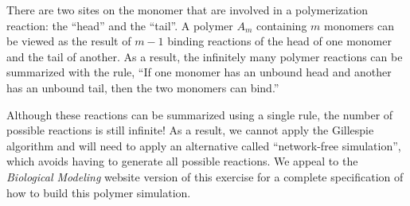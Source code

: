 There are two sites on the monomer  that are involved in a polymerization reaction: the ``head'' and the ``tail''. A polymer $A_m$ containing $m$ monomers can be viewed as the result of $m-1$ binding reactions of the head of one monomer and the tail of another. As a result, the infinitely many polymer reactions can be summarized with the rule, ``If one monomer has an unbound head and another has an unbound tail, then the two monomers can bind.''

Although these reactions can be summarized using a single rule, the number of possible reactions is still infinite! As a result, we cannot apply the Gillespie algorithm and will need to apply an alternative called ``network-free simulation'', which avoids having to generate all possible reactions. We appeal to the \textit{Biological Modeling} website version of this exercise for a complete specification of how to build this polymer simulation.\\

\begin{exercise}\end{exercise}

\begin{exercise}\end{exercise}


\newpage
\phantom{x}
\thispagestyle{empty}
